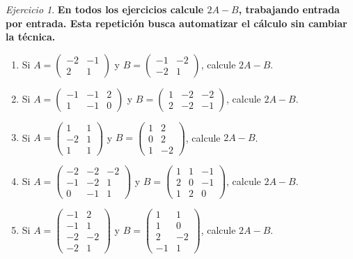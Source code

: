 \documentclass[12pt]{article}
\theoremstyle{remark}
\newtheorem{Ejer}[definicion]{Ejercicio}
\begin{document}
\begin{Ejer}

\textbf{En todos los ejercicios calcule $2A-B$, trabajando entrada por entrada. Esta repetición busca automatizar el cálculo sin cambiar la técnica.}
\begin{enumerate}[start=71]

\item Si $A=\begin{pmatrix}-2&-1\\2&1\end{pmatrix}$ y $B=\begin{pmatrix}-1&-2\\-2&1\end{pmatrix}$, calcule $2A-B$.

\item Si $A=\begin{pmatrix}-1&-1&2\\1&-1&0\end{pmatrix}$ y $B=\begin{pmatrix}1&-2&-2\\2&-2&-1\end{pmatrix}$, calcule $2A-B$.

\item Si $A=\begin{pmatrix}1&1\\-2&1\\1&1\end{pmatrix}$ y $B=\begin{pmatrix}1&2\\0&2\\1&-2\end{pmatrix}$, calcule $2A-B$.

\item Si $A=\begin{pmatrix}-2&-2&-2\\-1&-2&1\\0&-1&1\end{pmatrix}$ y $B=\begin{pmatrix}1&1&-1\\2&0&-1\\1&2&0\end{pmatrix}$, calcule $2A-B$.

\item Si $A=\begin{pmatrix}-1&2\\-1&1\\-2&-2\\-2&1\end{pmatrix}$ y $B=\begin{pmatrix}1&1\\1&0\\2&-2\\-1&1\end{pmatrix}$, calcule $2A-B$.


\end{enumerate}
\end{Ejer}
\end{document}
